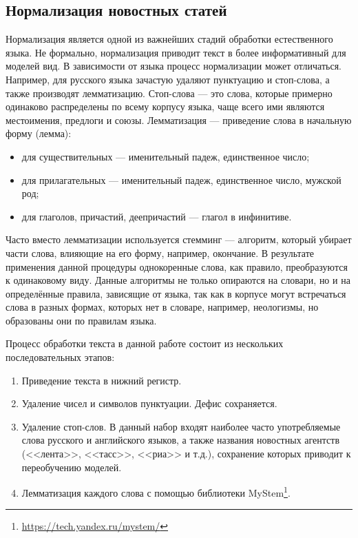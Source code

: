 \documentclass[a4paper, 14pt]{extarticle}
\begin{document}
\subsection{Нормализация новостных статей}
Нормализация является одной из важнейших стадий обработки естественного языка. Не формально, нормализация приводит текст в 
более информативный для моделей вид. В зависимости от языка процесс нормализации может отличаться. Например, для русского языка
зачастую удаляют пунктуацию и стоп-слова, а также производят лемматизацию. Стоп-слова --- это слова, которые примерно 
одинаково распределены по всему корпусу языка, чаще всего ими являются местоимения, предлоги и союзы. Лемматизация --- 
приведение слова в начальную форму (лемма):
\begin{itemize}
	\item для существительных --- именительный падеж, единственное число;
	\item для прилагательных --- именительный падеж, единственное число, мужской род;
	\item для глаголов, причастий, деепричастий --- глагол в инфинитиве.
\end{itemize}

Часто вместо лемматизации используется стемминг --- алгоритм, который убирает части 
слова, влияющие на его форму, например, окончание. В результате применения данной процедуры однокоренные слова, как правило,
преобразуются к одинаковому виду. Данные алгоритмы не только опираются на словари, но и на 
определённые правила, зависящие от языка, так как в корпусе могут встречаться слова в разных формах, которых нет в 
словаре, например, неологизмы, но образованы они по правилам языка.

Процесс обработки текста в данной работе состоит из нескольких последовательных этапов:
\begin{enumerate}
	\item Приведение текста в нижний регистр.
	\item Удаление чисел и символов пунктуации. Дефис сохраняется.
	\item Удаление стоп-слов. В данный набор входят наиболее часто употребляемые слова русского и английского языков,
	а также названия новостных агентств (<<лента>>, <<тасс>>, <<риа>> и т.д.), сохранение которых приводит к 
	переобучению моделей.
	\item Лемматизация каждого слова с помощью библиотеки MyStem\footnote{\url{https://tech.yandex.ru/mystem/}}.
\end{enumerate}
\end{document}
